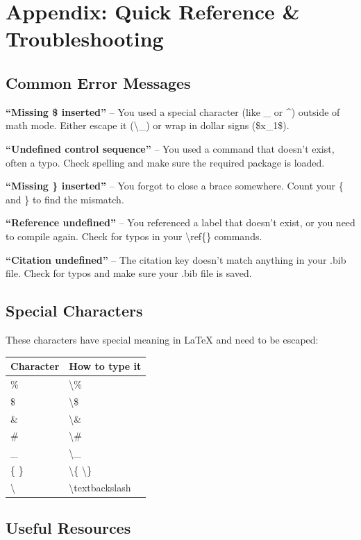 \documentclass[../main.tex]{subfiles}
\begin{document}
\section{Appendix: Quick Reference \& Troubleshooting}

\subsection*{Common Error Messages}

\textbf{``Missing \$ inserted''} -- You used a special character (like \_ or \^{}) outside of math mode. Either escape it (\textbackslash\_) or wrap in dollar signs (\$x\_1\$).

\textbf{``Undefined control sequence''} -- You used a command that doesn't exist, often a typo. Check spelling and make sure the required package is loaded.

\textbf{``Missing \} inserted''} -- You forgot to close a brace somewhere. Count your \{ and \} to find the mismatch.

\textbf{``Reference undefined''} -- You referenced a label that doesn't exist, or you need to compile again. Check for typos in your \textbackslash ref\{\} commands.

\textbf{``Citation undefined''} -- The citation key doesn't match anything in your .bib file. Check for typos and make sure your .bib file is saved.

\subsection*{Special Characters}

These characters have special meaning in \LaTeX{} and need to be escaped:

\begin{tabular}{ll}
\toprule
\textbf{Character} & \textbf{How to type it} \\
\midrule
\% & \textbackslash\% \\
\$ & \textbackslash\$ \\
\& & \textbackslash\& \\
\# & \textbackslash\# \\
\_ & \textbackslash\_ \\
\{ \} & \textbackslash\{ \textbackslash\} \\
\textbackslash & \textbackslash textbackslash \\
\bottomrule
\end{tabular}

\subsection*{Useful Resources}
\end{document}
